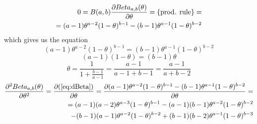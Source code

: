 \documentclass[a4paper,twoside=false,abstract=false,numbers=noenddot,
titlepage=false,headings=small,parskip=half,version=last]{scrartcl}
\begin{document}
\begin{solution}
    \begin{equation}
        \begin{split}
            \label{eq:dBeta}
            0=B(a,b)\frac{\partial{Beta_{a,b}(\theta)}}{\partial{\theta}}=\{\text{prod. rule}\}= \\
            =(a-1)\theta^{a-2}(1-\theta)^{b-1}-(b-1)\theta^{a-1}(1-\theta)^{b-2}
        \end{split}
    \end{equation}
    which gives us the equation
    \begin{equation}
        (a-1)\theta^{a-2}(1-\theta)^{b-1}=(b-1)\theta^{a-1}(1-\theta)^{b-2}
    \end{equation}
    \begin{equation}
        (a-1)(1-\theta)=(b-1)\theta 
    \end{equation}
    \begin{equation}
        \theta=\frac{1}{1+\frac{b-1}{a-1}}=
        \frac{a-1}{a-1+b-1}=\frac{a-1}{a+b-2} 
    \end{equation}
    \begin{equation}
        \begin{split}
            \frac{\partial^2{
                Beta_{a,b}(\theta)
            }}{\partial{
                \theta
            }^2}=
            \frac{\partial{
                (\eqref{eq:dBeta})
            }}{\partial{
                \theta
            }}=
            \frac{\partial{
                (a-1)\theta^{a-2}(1-\theta)^{b-1}-
                (b-1)\theta^{a-1}(1-\theta)^{b-2}
            }}{\partial{
                \theta
            }}= \\
            = (a-1)(a-2)\theta^{a-3}(1-\theta)^{b-1}
             -(a-1)(b-1)\theta^{a-2}(1-\theta)^{b-2} \\
             -(b-1)(a-1)\theta^{a-2}(1-\theta)^{b-2}
             +(b-1)(b-2)\theta^{a-1}(1-\theta)^{b-3}  
        \end{split}
    \end{equation}


\end{solution}
\end{document}

